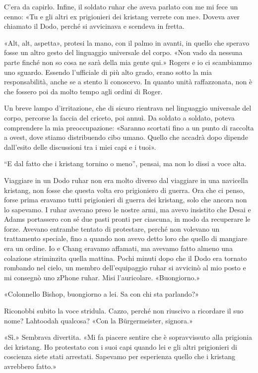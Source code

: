 C'era da capirlo. Infine, il soldato ruhar che aveva parlato con me mi
fece un cenno: «Tu e gli altri ex prigionieri dei kristang verrete con
me». Doveva aver chiamato il Dodo, perché si avvicinava e scendeva in
fretta.

«Alt, alt, aspetta», protesi la mano, con il palmo in avanti, in quello
che speravo fosse un altro gesto del linguaggio universale del corpo.
«Non vado da nessuna parte finché non so cosa ne sarà della mia gente
qui.» Rogers e io ci scambiammo uno sguardo. Essendo l'ufficiale di più
alto grado, erano sotto la mia responsabilità, anche se a stento li
conoscevo. In quanto unità raffazzonata, non è che fossero poi da molto
tempo agli ordini di Roger.

Un breve lampo d'irritazione, che di sicuro rientrava nel linguaggio
universale del corpo, percorse la faccia del criceto, poi annuì. Da
soldato a soldato, poteva comprendere la mia preoccupazione: «Saranno
scortati fino a un punto di raccolta a ovest, dove stiamo distribuendo
cibo umano. Quello che accadrà dopo dipende dall'esito delle discussioni
tra i miei capi e i tuoi».

``E dal fatto che i kristang tornino o meno'', pensai, ma non lo dissi a
voce alta.

Viaggiare in un Dodo ruhar non era molto diverso dal viaggiare in una
navicella kristang, non fosse che questa volta ero prigioniero di
guerra. Ora che ci penso, forse prima eravamo tutti prigionieri di
guerra dei kristang, solo che ancora non lo sapevamo. I ruhar avevano
preso le nostre armi, ma avevo insistito che Desai e Adams portassero
con sé due pasti pronti per ciascuna, in modo da recuperare le forze.
Avevano entrambe tentato di protestare, perché non volevano un
trattamento speciale, fino a quando non avevo detto loro che quello di
mangiare era un ordine. Io e Chang eravamo affamati, ma avevamo fatto
almeno una colazione striminzita quella mattina. Pochi minuti dopo che
il Dodo era tornato rombando nel cielo, un membro dell'equipaggio ruhar
si avvicinò al mio posto e mi consegnò uno zPhone ruhar. Misi
l'auricolare. «Buongiorno.»

«Colonnello Bishop, buongiorno a lei. Sa con chi sta parlando?»

Riconobbi subito la voce stridula. Cazzo, perché non riuscivo a
ricordare il suo nome? Lahtoodah qualcosa? «Con la Bürgermeister,
signora.»

«Sì.» Sembrava divertita. «Mi fa piacere sentire che è sopravvissuto
alla prigionia dei kristang. Ho protestato con i suoi capi quando lei e
gli altri prigionieri di coscienza siete stati arrestati. Sapevamo per
esperienza quello che i kristang avrebbero fatto.»

